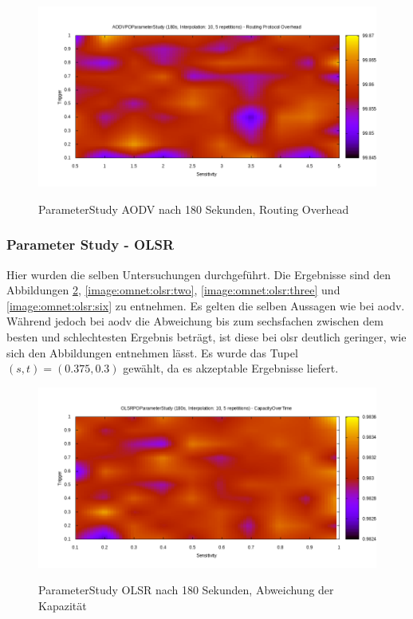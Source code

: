 \begin{figure}
  \centering
  \includegraphics[scale=0.45]{bilder/aps6.png} \\
  \caption{ParameterStudy AODV nach 180 Sekunden, Routing Overhead}
  \label{image:omnet:aodv:six}
\end{figure}

\subsubsection{Parameter Study - OLSR}
\label{chapter:auswertung:studyaodv}

Hier wurden die selben Untersuchungen durchgeführt. Die Ergebnisse sind den Abbildungen \ref{image:omnet:olsr:one}, \ref{image:omnet:olsr:two}, \ref{image:omnet:olsr:three} und \ref{image:omnet:olsr:six} zu entnehmen. Es gelten die selben Aussagen wie bei \gls{aodv}. Während jedoch bei \gls{aodv} die Abweichung bis zum sechsfachen zwischen dem besten und schlechtesten Ergebnis beträgt, ist diese bei \gls{olsr} deutlich geringer, wie sich den Abbildungen entnehmen lässt. Es wurde das Tupel $(s,t) = (0{.}375 ,0{.}3)$ gewählt, da es akzeptable Ergebnisse liefert.

\begin{figure}
  \centering
  \includegraphics[scale=0.45]{bilder/ops1.png} \\
  \caption{ParameterStudy OLSR nach 180 Sekunden, Abweichung der Kapazität}
  \label{image:omnet:olsr:one}
\end{figure}

